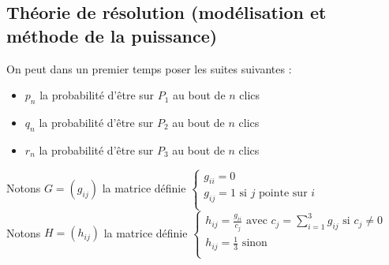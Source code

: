 \documentclass[a4paper,10pt]{report}
\begin{document}
\subsection{Théorie de résolution (modélisation et méthode de la puissance)}
\indent On peut dans un premier temps poser les suites suivantes :
\begin{itemize}
\item $p_n$ la probabilité d'être sur $P_1$ au bout de $n$ clics
\item $q_n$ la probabilité d'être sur $P_2$ au bout de $n$ clics
\item $r_n$ la probabilité d'être sur $P_3$ au bout de $n$ clics
\end{itemize}
Notons $G=(g_{ij})$ la matrice définie
$\left\lbrace
\begin{array}{l}
g_{ii}=0  \\
g_{ij}=1 \text{ si } j \text{ pointe sur } i \\
\end{array}\right. $\\
Notons $H=(h_{ij})$ la matrice définie
$\left\lbrace
\begin{array}{l}
h_{ij}= \frac{g_{ii}}{c_j} \text{ avec } c_j=\sum^3_{i=1} g_{ij} \text{ si } c_j \ne 0 \\
h_{ij}= \frac{1}{3} \text{ sinon} \\
\end{array}\right. $ \\ \\
\end{document}
